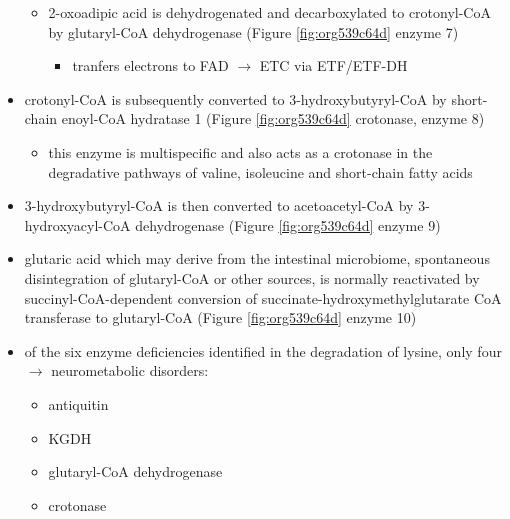 \documentclass{scrartcl}
\begin{document}
\begin{itemize}
\begin{itemize}
\item 2-oxoadipic acid is dehydrogenated and decarboxylated to
crotonyl-CoA by glutaryl-CoA dehydrogenase (Figure \ref{fig:org539c64d} enzyme 7)
\begin{itemize}
\item tranfers electrons to FAD \(\to\) ETC via ETF/ETF-DH
\end{itemize}
\end{itemize}

\item crotonyl-CoA is subsequently converted to 3-hydroxybutyryl-CoA by
short-chain enoyl-CoA hydratase 1 (Figure \ref{fig:org539c64d} crotonase, enzyme 8)
\begin{itemize}
\item this enzyme is multispecific and also acts as a crotonase in the
degradative pathways of valine, isoleucine and short-chain fatty
acids
\end{itemize}

\item 3-hydroxybutyryl-CoA is then converted to acetoacetyl-CoA by
3-hydroxyacyl-CoA dehydrogenase (Figure \ref{fig:org539c64d} enzyme 9)
\item glutaric acid which may derive from the intestinal microbiome,
spontaneous disintegration of glutaryl-CoA or other sources, is
normally reactivated by succinyl-CoA-dependent conversion of
succinate-hydroxymethylglutarate CoA transferase to glutaryl-CoA
(Figure \ref{fig:org539c64d} enzyme 10)

\item of the six enzyme deficiencies identified in the degradation of
lysine, only four \(\to\) neurometabolic disorders:
\begin{itemize}
\item antiquitin
\item KGDH
\item glutaryl-CoA dehydrogenase
\item crotonase
\end{itemize}
\end{itemize}
\end{document}
